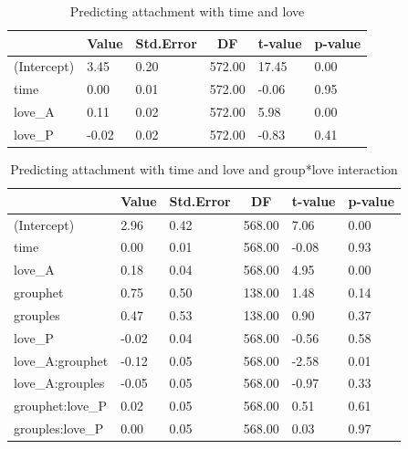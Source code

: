 \documentclass[man]{apa6}
\begin{document}
\begin{table}[tbp]

\begin{center}
\begin{threeparttable}

\caption{\label{tab:unnamed-chunk-16}Predicting attachment with time and love}

\begin{tabular}{llllll}
\toprule
 & \multicolumn{1}{c}{Value} & \multicolumn{1}{c}{Std.Error} & \multicolumn{1}{c}{DF} & \multicolumn{1}{c}{t-value} & \multicolumn{1}{c}{p-value}\\
\midrule
(Intercept) & 3.45 & 0.20 & 572.00 & 17.45 & 0.00\\
time & 0.00 & 0.01 & 572.00 & -0.06 & 0.95\\
love\_A & 0.11 & 0.02 & 572.00 & 5.98 & 0.00\\
love\_P & -0.02 & 0.02 & 572.00 & -0.83 & 0.41\\
\bottomrule
\end{tabular}

\end{threeparttable}
\end{center}

\end{table}

\begin{table}[tbp]

\begin{center}
\begin{threeparttable}

\caption{\label{tab:unnamed-chunk-17}Predicting attachment with time and love and group*love interaction}

\begin{tabular}{llllll}
\toprule
 & \multicolumn{1}{c}{Value} & \multicolumn{1}{c}{Std.Error} & \multicolumn{1}{c}{DF} & \multicolumn{1}{c}{t-value} & \multicolumn{1}{c}{p-value}\\
\midrule
(Intercept) & 2.96 & 0.42 & 568.00 & 7.06 & 0.00\\
time & 0.00 & 0.01 & 568.00 & -0.08 & 0.93\\
love\_A & 0.18 & 0.04 & 568.00 & 4.95 & 0.00\\
grouphet & 0.75 & 0.50 & 138.00 & 1.48 & 0.14\\
grouples & 0.47 & 0.53 & 138.00 & 0.90 & 0.37\\
love\_P & -0.02 & 0.04 & 568.00 & -0.56 & 0.58\\
love\_A:grouphet & -0.12 & 0.05 & 568.00 & -2.58 & 0.01\\
love\_A:grouples & -0.05 & 0.05 & 568.00 & -0.97 & 0.33\\
grouphet:love\_P & 0.02 & 0.05 & 568.00 & 0.51 & 0.61\\
grouples:love\_P & 0.00 & 0.05 & 568.00 & 0.03 & 0.97\\
\bottomrule
\end{tabular}

\end{threeparttable}
\end{center}

\end{table}
\end{document}

